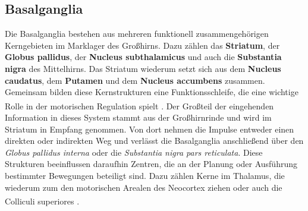 \subsection{Basalganglia} \label{subsec:basalganglien} 
Die Basalganglia bestehen aus mehreren funktionell zusammengehörigen Kerngebieten im Marklager des Großhirns. Dazu zählen das \textbf{Striatum}, der \textbf{Globus pallidus}, der \textbf{Nucleus subthalamicus}  und auch die \textbf{Substantia nigra}  des Mittelhirns. Das Striatum wiederum setzt sich aus dem \textbf{Nucleus caudatus}, dem \textbf{Putamen} und dem \textbf{Nucleus accumbens} zusammen. Gemeinsam bilden diese Kernstrukturen eine Funktionsschleife, die eine wichtige Rolle in der motorischen Regulation spielt \textsuperscript{\cite[Kap.~9]{trepel2011neuroanatomie}}. Der Großteil der eingehenden Information in dieses System stammt aus der Großhirnrinde und wird im Striatum in Empfang genommen. Von dort nehmen die Impulse entweder einen direkten oder indirekten Weg und verlässt die Basalganglia anschließend über den \textit{Globus pallidus interna} oder die \textit{Substantia nigra pars reticulata}. Diese Strukturen beeinflussen daraufhin Zentren, die an der Planung oder Ausführung bestimmter Bewegungen beteiligt sind. Dazu zählen Kerne im Thalamus, die wiederum zum den motorischen Arealen des Neocortex ziehen oder auch die Colliculi superiores \textsuperscript{\cite[Kap.~17]{paxinos2014rat}}.   


